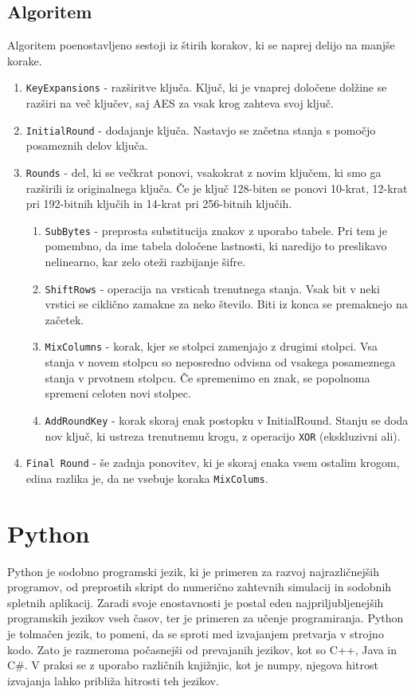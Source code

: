 \documentclass[a4paper, 12pt]{article}
\begin{document}
    \subsection{Algoritem}
        Algoritem poenostavljeno sestoji iz štirih korakov, ki se naprej delijo na manjše korake.
        \begin{enumerate}
            \item \texttt{KeyExpansions} - razširitve ključa. Ključ, ki je vnaprej določene dolžine se razširi na več ključev, saj AES za vsak krog zahteva svoj ključ.
            \item \texttt{InitialRound} - dodajanje ključa. Nastavjo se začetna stanja s pomočjo posameznih delov ključa.
            \item \texttt{Rounds} - del, ki se večkrat ponovi, vsakokrat z novim ključem, ki smo ga razširili iz originalnega ključa. Če je ključ 128-biten se ponovi 10-krat, 12-krat pri 192-bitnih ključih in 14-krat pri 256-bitnih ključih.
                \begin{enumerate}
                    \item \texttt{SubBytes} - preprosta substitucija znakov z uporabo tabele. Pri tem je pomembno, da ime tabela določene lastnosti, ki naredijo to preslikavo nelinearno, kar zelo oteži razbijanje šifre.
                    \item \texttt{ShiftRows} - operacija na vrsticah trenutnega stanja. Vsak bit v neki vrstici se ciklično zamakne za neko število. Biti iz konca se premaknejo na začetek.
                    \item \texttt{MixColumns} - korak, kjer se stolpci zamenjajo z drugimi stolpci. Vsa stanja v novem stolpcu so neposredno odvisna od vsakega posameznega stanja v prvotnem stolpcu. Če spremenimo en znak, se popolnoma spremeni celoten novi stolpec.
                    \item \texttt{AddRoundKey} - korak skoraj enak postopku v InitialRound. Stanju se doda nov ključ, ki ustreza trenutnemu krogu, z operacijo \texttt{XOR} (ekskluzivni ali).
                \end{enumerate}
            \item \texttt{Final Round} - še zadnja ponovitev, ki je skoraj enaka vsem ostalim krogom, edina razlika je, da ne vsebuje koraka \texttt{MixColums}.\cite{wikipedia-aes}
        \end{enumerate}

\section{Python}
    Python je sodobno programski jezik, ki je primeren za razvoj najrazličnejših programov, od preprostih skript do numerično zahtevnih simulacij in sodobnih spletnih aplikacij. Zaradi svoje enostavnosti je postal eden najpriljubljenejših programskih jezikov vseh časov, ter je primeren za učenje programiranja. Python je tolmačen jezik, to pomeni, da se sproti med izvajanjem pretvarja v strojno kodo. Zato je razmeroma počasnejši od prevajanih jezikov, kot so C++, Java in C\#. V praksi se z uporabo različnih knjižnjic, kot je numpy, njegova hitrost izvajanja lahko približa hitrosti teh jezikov.
\end{document}
